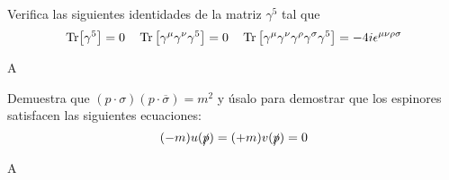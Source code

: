 \begin{solucion} 
	
\end{solucion}


\begin{ejercicio} 
	Verifica las siguientes identidades de la matriz $\gamma^5$ tal que
	\begin{equation}
		\Tr [\gamma^5] = 0 \quad \Tr \left[ \gamma^\mu \gamma^\nu \gamma^5 \right] = 0 \quad \Tr \left[ \gamma^\mu \gamma^\nu \gamma^\rho \gamma^\sigma \gamma^5 \right]  = - 4 i \epsilon^{\mu \nu \rho \sigma}
	\end{equation}
\end{ejercicio}


\begin{solucion} 
	A
\end{solucion}



\begin{ejercicio} 
	Demuestra que $(p\cdot \sigma)(p\cdot \overline{\sigma}) = m^2$ y úsalo para demostrar que los espinores satisfacen las siguientes ecuaciones:
	\begin{equation}
		( - m ) u (\slashed{p}) = ( + m) v(\slashed{p}) = 0
	\end{equation}
\end{ejercicio}


\begin{solucion} 
	A
\end{solucion}


